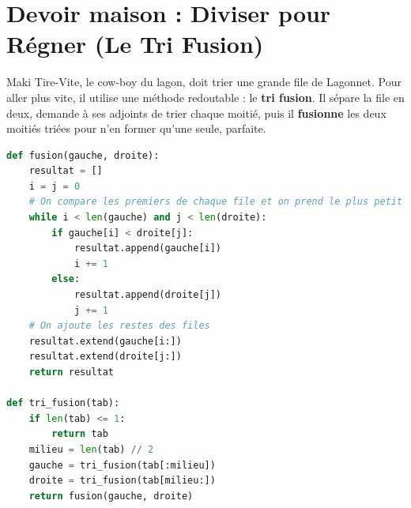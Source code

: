 \section*{Devoir maison : Diviser pour Régner (Le Tri Fusion)}

Maki Tire-Vite, le cow-boy du lagon, doit trier une grande file de Lagonnet. Pour aller plus vite, il utilise une méthode redoutable : le \textbf{tri fusion}. Il sépare la file en deux, demande à ses adjoints de trier chaque moitié, puis il \textbf{fusionne} les deux moitiés triées pour n'en former qu'une seule, parfaite.

\begin{lstlisting}[language=Python]
def fusion(gauche, droite):
    resultat = []
    i = j = 0
    # On compare les premiers de chaque file et on prend le plus petit
    while i < len(gauche) and j < len(droite):
        if gauche[i] < droite[j]:
            resultat.append(gauche[i])
            i += 1
        else:
            resultat.append(droite[j])
            j += 1
    # On ajoute les restes des files
    resultat.extend(gauche[i:])
    resultat.extend(droite[j:])
    return resultat

def tri_fusion(tab):
    if len(tab) <= 1:
        return tab
    milieu = len(tab) // 2
    gauche = tri_fusion(tab[:milieu])
    droite = tri_fusion(tab[milieu:])
    return fusion(gauche, droite)
\end{lstlisting}

